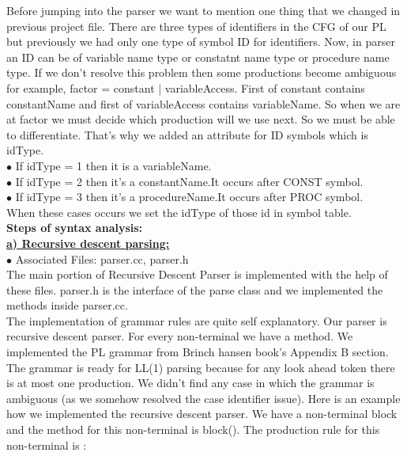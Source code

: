 \documentclass[paper=letter, fontsize=12pt]{scrartcl} %
\begin{document}
Before jumping into the parser we want to mention one thing that we changed in previous project file. There are three types of identifiers in the CFG of our PL but previously we had only one type of symbol ID for identifiers. Now, in parser an ID can be of variable name type or constatnt name type or procedure name type. If we don't resolve this problem then some productions become ambiguous for example, factor = constant | variableAccess. First of constant contains constantName and first of variableAccess contains variableName. So when we are at factor we must decide which production will we use next. So we must be able to differentiate. That's why we added an attribute for ID symbols which is idType.\\

$\bullet$ If idType = 1 then it is a variableName.\\ 
$\bullet$ If idType = 2	then it's a constantName.It occurs after CONST symbol.\\
$\bullet$ If idType = 3 then it's a procedureName.It occurs after PROC symbol. \\ 

When these cases occurs we set the idType of those id in symbol table.\\

\pagebreak
{\bf Steps of syntax analysis:}\\

\underline {\bf a) Recursive descent parsing:}\\

$\bullet$ Associated Files: parser.cc, parser.h\\ 

The main portion of Recursive Descent Parser is implemented with the help of these files. parser.h is the interface of the parse class and we implemented the methods inside parser.cc.\\

The implementation of grammar rules are quite self explanatory. Our parser is recursive descent parser. For every non-terminal we have a method. We implemented the PL grammar from Brinch hansen book's Appendix B section. The grammar is ready for LL(1) parsing because for any look ahead token there is at most one production. We didn't find any case in which the grammar is ambiguous (as we somehow resolved the case identifier issue). Here is an example how we implemented the recursive descent parser. We have a non-terminal block and the method for this non-terminal is block(). The production rule for this non-terminal is :\\
\end{document}
